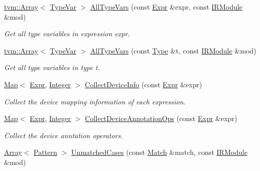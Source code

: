\begin{DoxyCompactItemize}
\hyperlink{classtvm_1_1Array}{tvm\+::\+Array}$<$ \hyperlink{namespacetvm_1_1relay_a63321eb51080f3f57dd7563a3ca0bfa6}{Type\+Var} $>$ \hyperlink{namespacetvm_1_1relay_ae67484a25663dfe2f87cbad53075abbf}{All\+Type\+Vars} (const \hyperlink{namespacetvm_1_1relay_a5b84e3790f89bb3fad5c7911eeb99531}{Expr} \&expr, const \hyperlink{classtvm_1_1IRModule}{I\+R\+Module} \&mod)
\begin{DoxyCompactList}\small\item\em Get all type variables in expression expr. \end{DoxyCompactList}\item 
\hyperlink{classtvm_1_1Array}{tvm\+::\+Array}$<$ \hyperlink{namespacetvm_1_1relay_a63321eb51080f3f57dd7563a3ca0bfa6}{Type\+Var} $>$ \hyperlink{namespacetvm_1_1relay_ad24361b252cdb636192641e6801f2666}{All\+Type\+Vars} (const \hyperlink{namespacetvm_1_1relay_a661d95f170bca230773914caeef3fe52}{Type} \&t, const \hyperlink{classtvm_1_1IRModule}{I\+R\+Module} \&mod)
\begin{DoxyCompactList}\small\item\em Get all type variables in type t. \end{DoxyCompactList}\item 
\hyperlink{classtvm_1_1Map}{Map}$<$ \hyperlink{namespacetvm_1_1relay_a5b84e3790f89bb3fad5c7911eeb99531}{Expr}, \hyperlink{classtvm_1_1Integer}{Integer} $>$ \hyperlink{namespacetvm_1_1relay_ab6e35e7086b1f79ae55651500f94116b}{Collect\+Device\+Info} (const \hyperlink{namespacetvm_1_1relay_a5b84e3790f89bb3fad5c7911eeb99531}{Expr} \&expr)
\begin{DoxyCompactList}\small\item\em Collect the device mapping information of each expression. \end{DoxyCompactList}\item 
\hyperlink{classtvm_1_1Map}{Map}$<$ \hyperlink{namespacetvm_1_1relay_a5b84e3790f89bb3fad5c7911eeb99531}{Expr}, \hyperlink{classtvm_1_1Integer}{Integer} $>$ \hyperlink{namespacetvm_1_1relay_a4e17d61a10c7781b004559a5b7430047}{Collect\+Device\+Annotation\+Ops} (const \hyperlink{namespacetvm_1_1relay_a5b84e3790f89bb3fad5c7911eeb99531}{Expr} \&expr)
\begin{DoxyCompactList}\small\item\em Collect the device anntation operators. \end{DoxyCompactList}\item 
\hyperlink{classtvm_1_1Array}{Array}$<$ \hyperlink{classtvm_1_1relay_1_1Pattern}{Pattern} $>$ \hyperlink{namespacetvm_1_1relay_aa3a8cace40f8056fd6412f39c3eaa605}{Unmatched\+Cases} (const \hyperlink{classtvm_1_1relay_1_1Match}{Match} \&match, const \hyperlink{classtvm_1_1IRModule}{I\+R\+Module} \&mod)

\end{DoxyCompactItemize}
